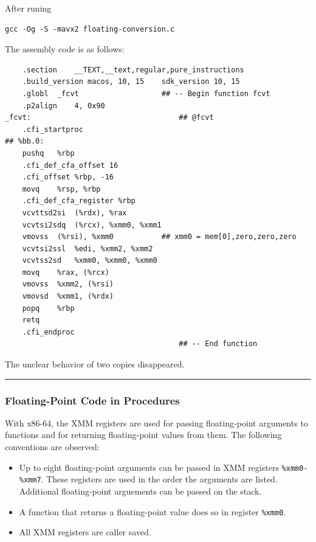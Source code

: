 \documentclass[11pt]{article}
\begin{document}
After runing\\
\begin{verbatim}
gcc -Og -S -mavx2 floating-conversion.c
\end{verbatim}

The assembly code is as follows:\\
\begin{verbatim}
	.section	__TEXT,__text,regular,pure_instructions
	.build_version macos, 10, 15	sdk_version 10, 15
	.globl	_fcvt                   ## -- Begin function fcvt
	.p2align	4, 0x90
_fcvt:                                  ## @fcvt
	.cfi_startproc
## %bb.0:
	pushq	%rbp
	.cfi_def_cfa_offset 16
	.cfi_offset %rbp, -16
	movq	%rsp, %rbp
	.cfi_def_cfa_register %rbp
	vcvttsd2si	(%rdx), %rax
	vcvtsi2sdq	(%rcx), %xmm0, %xmm1
	vmovss	(%rsi), %xmm0           ## xmm0 = mem[0],zero,zero,zero
	vcvtsi2ssl	%edi, %xmm2, %xmm2
	vcvtss2sd	%xmm0, %xmm0, %xmm0
	movq	%rax, (%rcx)
	vmovss	%xmm2, (%rsi)
	vmovsd	%xmm1, (%rdx)
	popq	%rbp
	retq
	.cfi_endproc
                                        ## -- End function
\end{verbatim}

The unclear behavior of two copies disappeared.\\

\noindent\rule{\textwidth}{0.5pt}

\subsubsection{Floating-Point Code in Procedures}
\label{sec:org63c3e2e}

With x86-64, the XMM registers are used for passing floating-point arguments to functions and for returning floating-point values from them. The following conventions are observed:\\
\begin{itemize}
\item Up to eight floating-point arguments can be passed in XMM registers \texttt{\%xmm0-\%xmm7}. These registers are used in the order the arguments are listed. Additional floating-point arguements can be passed on the stack.\\
\item A function that returns a floating-point value does so in register \texttt{\%xmm0}.\\
\item All XMM registers are caller saved.\\
\end{itemize}
\end{document}
